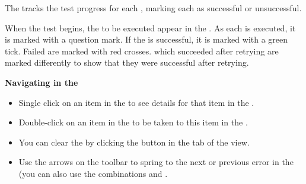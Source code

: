 % 
%
%

The \gdtestresultview{}  tracks the test progress for each \gdsuite{}, marking each \gdstep{} as successful or unsuccessful.

When the test begins, the \gdsteps{} to be executed appear in the \gdtestresultview{}. As each \gdstep{} is executed, it is marked with a question mark. If the \gdstep{} is successful, it is marked with a green tick. Failed \gdsteps{} are marked with red crosses. \gdsteps{} which succeeded after retrying  are marked differently to show that they were successful after retrying. 

\textbf{Navigating in the \gdtestresultview{}}\\
\begin{itemize}
\item Single click on an item in the \gdtestresultview{} to see details for that item in the \gdpropview{}.
\item Double-click on an item in the \gdtestresultview{} to be taken to this item in the \gdsuite{}. 
\item You can clear the \gdtestresultview{} by clicking the  button in the tab of the view. 
\item Use the arrows on the toolbar to spring to the next or previous error in the \gdtestresultview{} (you can also use the combinations  and .
\end{itemize}

